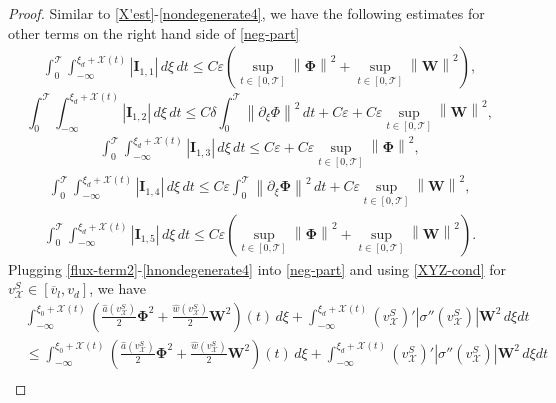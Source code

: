 \documentclass[12pt,reqno]{amsart}
\numberwithin{equation}{section}
\newcommand{\norm}[1]{\left\lVert #1 \right\rVert}
\def\p{\partial}
\def\T{\mathcal{T}}
\def\supt{\mathop{sup}\limits_{t \in [0,\mathcal{T}]}}
\def\ph{\mathbf{\Phi}}
\def\w{\mathbf{W}}
\def\vsx{v^S_{\mathcal{X}}}
\def\avl{\overline{v}_l}
\def\X{\mathcal{X}}
\begin{document}
\begin{proof}
Similar to \eqref{X'est}-\eqref{nondegenerate4}, we have the following estimates for other terms on the right hand side of \eqref{neg-part}
	\begin{equation}\label{hX'est}
		\begin{aligned}
			\int_{0}^{\T}\int_{-\infty}^{\xi_{d}+\X(t)}|\mathbf{I}_{1,1}|\,d\xi\,dt\leq C\varepsilon(\supt\norm{\ph}^2+\supt\norm{\w}^2),
		\end{aligned}
	\end{equation}
	\begin{equation}\label{hnondegenerate1}
			\int_{0}^{\T} \int_{-\infty}^{\xi_{d}+\X(t)}|\mathbf{I}_{1,2}|\,d\xi\,dt\leq C\delta\int_{0}^{\T}\norm{\p_{\xi}\Phi}^2\,dt+C\varepsilon+C\varepsilon \supt\norm{\w}^2,
	\end{equation}
	\begin{equation}\label{hnondegenerate2}
		\begin{aligned}
			\int_{0}^{\T} \int_{-\infty}^{\xi_{d}+\X(t)}|\mathbf{I}_{1,3}|\,d\xi\,dt\leq C\varepsilon+C\varepsilon \supt\norm{\ph}^2,
		\end{aligned}
	\end{equation}
	\begin{equation}\label{hnondegenerate3}
		\begin{aligned}
			\int_{0}^{\T} \int_{-\infty}^{\xi_{d}+\X(t)}|\mathbf{I}_{1,4}|\,d\xi\,dt
			\leq C\varepsilon\int_{0}^{\T} \norm{\p_{\xi}\ph}^2 \,dt+C\varepsilon\supt\norm{\w}^2,
		\end{aligned}
	\end{equation}
	\begin{equation}\label{hnondegenerate4}
		\begin{aligned}
			\int_{0}^{\T} \int_{-\infty}^{\xi_{d}+\X(t)}|\mathbf{I}_{1,5}|\,d\xi\,dt\leq C\varepsilon(\supt\norm{\ph}^2+\supt\norm{\w}^2).
		\end{aligned}
	\end{equation}
	Plugging \eqref{flux-term2}-\eqref{hnondegenerate4} into \eqref{neg-part} and using \eqref{XYZ-cond} for $\vsx\in[\avl,v_d]$, we have
	\begin{equation}\label{neg-integral}
		\begin{aligned}
			&\int_{-\infty}^{\xi_{0}+\X(t)}\left(\frac{\hat{a}(\vsx)}{2}\ph^2+\frac{\hat{w}(\vsx)}{2}\w^2\right)(t)\,d\xi+\int_{-\infty}^{\xi_{d}+\X(t)}(\vsx)'|\sigma''(\vsx)|\w^2\,d\xi dt\\
			&\leq\int_{-\infty}^{\xi_{0}+\X(t)}\left(\frac{\hat{a}(\vsx)}{2}\ph^2+\frac{\hat{w}(\vsx)}{2}\w^2\right)(t)\,d\xi+\int_{-\infty}^{\xi_{d}+\X(t)}(\vsx)'|\sigma''(\vsx)|\w^2\,d\xi dt\\

\end{aligned}
\end{equation}
\end{proof}
\end{document}
